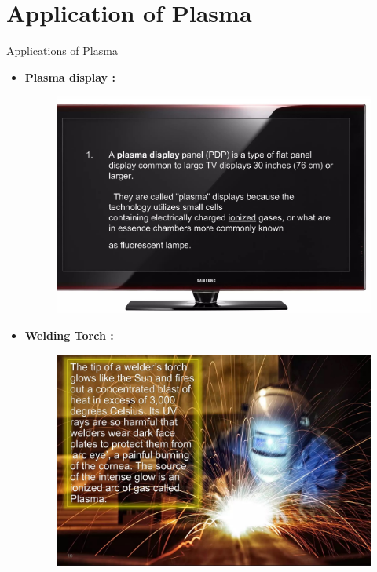 \documentclass[13pt]{beamer}
\begin{document}
\section{Application of Plasma}
\begin{frame}[t,allowframebreaks]{Applications of Plasma}
\begin{itemize}
		\item  \textbf{Plasma display : }
		\begin{figure}
			\includegraphics[height= 0.5\textwidth]{Images/apps (1).jpg}
		\end{figure}


		\item  \textbf{Welding Torch : }
		\begin{figure}
			\centering
			\includegraphics[height=0.5\textwidth]{Images/apps (3).jpg}
		\end{figure}

\end{itemize}



\end{frame}
\end{document}

